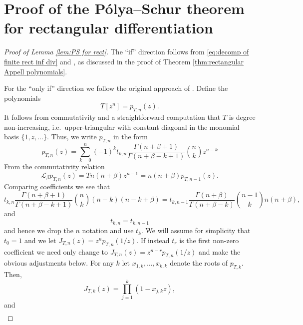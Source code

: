 \documentclass[reqno]{amsart}
\newcommand{\1}{\mathbf{1}}
\theoremstyle{plain}
\theoremstyle{definition}
\theoremstyle{remark}
\numberwithin{equation}{section}
\begin{document}
 \section{Proof of the P\'olya--Schur theorem for rectangular differentiation} \label{appendix}
\begin{proof}[Proof of Lemma \ref{lem:PS for rect}]
	The ``if'' direction follows from \eqref{eq:decomp of finite rect inf div} and \cite[Theorem 1.16]{Marcus-Spielman-Srivastava2022}, as discussed in the proof of Theorem \ref{thm:rectangular Appell polynomials}.
	
	
	For the ``only if'' direction we follow the original approach of \cite{Schur--Polya1914,Benz1935}. Define the polynomials \begin{equation}\label{eq:T Lag-Appell}
		T[z^n]=p_{T,n}(z).
	\end{equation} It follows from commutativity and a straightforward computation that $T$ is  degree non-increasing,  i.e.~upper-triangular with constant diagonal in the monomial basis $\{1,z,\dots\}$. Thus, we write $p_{T,n}$ in the form \begin{equation}
	p_{T,n}(z)=\sum_{k=0}^{n}(-1)^{k}t_{k,n}\frac{\Gamma(n+\beta+1)}{\Gamma(n+\beta-k+1)}\binom{n}{k}z^{n-k}
	\end{equation}  From the commutativity relation \begin{equation}
	\mathscr{L}_{\beta}p_{T,n}(z)=Tn(n+\beta)z^{n-1}=n(n+\beta)p_{T,n-1}(z).
	\end{equation} Comparing coefficients we see that \begin{equation}
	t_{k,n}\frac{\Gamma(n+\beta+1)}{\Gamma(n+\beta-k+1)}\binom{n}{k}(n-k)(n-k+\beta)=t_{k,n-1}\frac{\Gamma(n+\beta)}{\Gamma(n+\beta-k)}\binom{n-1}{k}n(n+\beta),
	\end{equation} and \begin{equation}
	t_{k,n}=t_{k,n-1}
	\end{equation} and hence we drop the $n$ notation and use $t_k$. We will assume for simplicity that $t_0=1$ and we let $J_{T,n}(z)=z^np_{T,n}(1/z)$. If instead $t_{r}$ is the first non-zero coefficient we need only change to $J_{T,n}(z)=z^{n-r}p_{T,n}(1/z)$ and make the obvious adjustments below.  For any $k$ let $x_{1,k},\dots,x_{k,k}$ denote the roots of $p_{T,k}$.
	Then, \begin{equation}
	J_{T,k}(z)=\prod_{j=1}^{k}\left(1-x_{j,k}z\right),
	\end{equation} and \begin{equation}
\begin{aligned}

\end{aligned}
\end{equation}
\end{proof}
\end{document}
